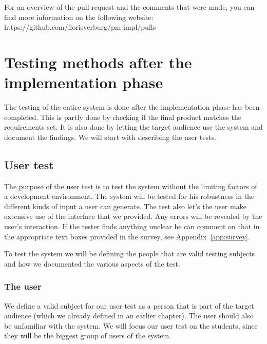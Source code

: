 For an overview of the pull request and the comments that were made, you can find more information on the following website:
https://github.com/florisverburg/pm-impl/pulls

\section{Testing methods after the implementation phase}
The testing of the entire system is done after the implementation phase has been completed.
This is partly done by checking if the final product matches the requirements set.
It is also done by letting the target audience use the system and document the findings.
We will start with describing the user tests.

\subsection{User test}
The purpose of the user test is to test the system without the limiting factors of a development environment.
The system will be tested for his robustness in the different kinds of input a user can generate.
The test also let's the user make extensive use of the interface that we provided.
Any errors will be revealed by the user's interaction.
If the tester finds anything unclear he can comment on that in the appropriate text boxes provided in the survey, see Appendix~\ref{app:survey}.

To test the system we will be defining the people that are valid testing subjects and how we documented the various aspects of the test.

\subsubsection{The user}
We define a valid subject for our user test as a person that is part of the target audience (which we already defined in an earlier chapter).
The user should also be unfamiliar with the system.
We will focus our user test on the students, since they will be the biggest group of users of the system.

